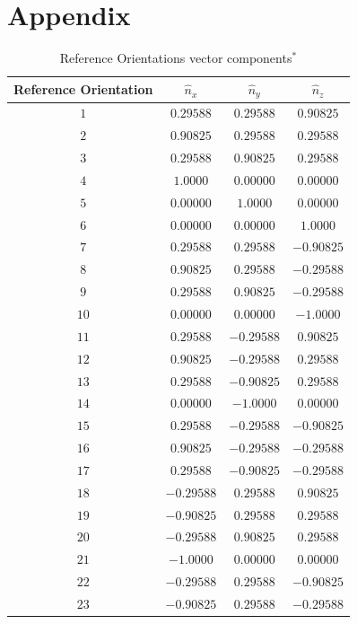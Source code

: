 \documentclass[preprint,3p]{elsarticle}
\begin{document}
\section*{Appendix}
\label{Appendix 1}
\begin{table}[h]
	\begin{center}
		\caption{\label{tab:n} Reference Orientations vector components$^*$}
		\begin{tabular}{|c|c|c|c|}
			\hline\hline
			Reference Orientation & $\hat{n}_x$ &  $\hat{n}_y$ &  $\hat{n}_z$ \\
			\hline
			$1$ & $ 0.29588$ &  $ 0.29588$ & $ 0.90825$ \\
			$2$ & $ 0.90825$ &  $ 0.29588$ & $ 0.29588$ \\
			$3$ & $ 0.29588$ &  $ 0.90825$ & $ 0.29588$ \\
			$4$ & $1.0000$ &  $0.00000$ & $0.00000$ \\
			$5$ & $0.00000$ &  $1.0000$ & $0.00000$ \\
			$6$ & $0.00000$ &  $0.00000$ & $1.0000$ \\
			$7$ & $ 0.29588$ &  $ 0.29588$ & $-0.90825$ \\
			$8$ & $ 0.90825$ &  $ 0.29588$ & $-0.29588$ \\
			$9$ & $ 0.29588$ &  $ 0.90825$ & $-0.29588$ \\
			$10$ & $0.00000$ &  $0.00000$ & $-1.0000$ \\
			$11$ & $ 0.29588$ &  $-0.29588$ & $ 0.90825$ \\
			$12$ & $ 0.90825$ &  $-0.29588$ & $ 0.29588$ \\
			$13$ & $ 0.29588$ &  $-0.90825$ & $ 0.29588$ \\
			$14$ & $0.00000$ &  $-1.0000$ & $0.00000$ \\
			$15$ & $ 0.29588$ &  $-0.29588$ & $-0.90825$ \\
			$16$ & $ 0.90825$ &  $-0.29588$ & $-0.29588$ \\
			$17$ & $ 0.29588$ &  $-0.90825$ & $-0.29588$ \\
			$18$ & $-0.29588$ &  $ 0.29588$ & $ 0.90825$ \\
			$19$ & $-0.90825$ &  $ 0.29588$ & $ 0.29588$ \\
			$20$ & $-0.29588$ &  $ 0.90825$ & $ 0.29588$ \\
			$21$ & $-1.0000$ &  $0.00000$ & $0.00000$ \\
			$22$ & $-0.29588$ &  $ 0.29588$ & $-0.90825$ \\
			$23$ & $-0.90825$ &  $ 0.29588$ & $-0.29588$ \\

\end{tabular}
\end{center}
\end{table}
\end{document}
